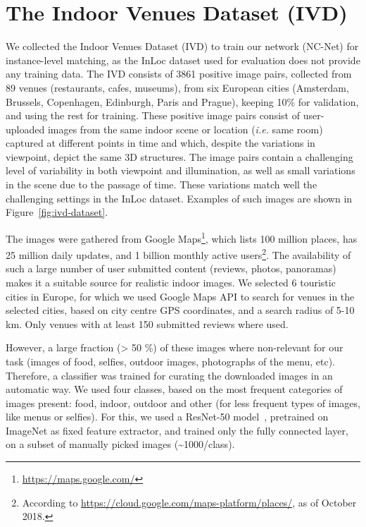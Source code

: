 \documentclass{article}
\begin{document}
\section{The Indoor Venues Dataset (IVD)\label{apx:indoor_venues_dataset}}
We collected the Indoor Venues Dataset (IVD) to train our network (NC-Net) for instance-level matching, as the InLoc \cite{Taira18} dataset
 used for evaluation does not provide any training data. 
The IVD consists of 3861 positive image pairs, collected from 89 venues (restaurants, cafes, museums), from six European cities (Amsterdam, Brussels, Copenhagen, Edinburgh, Paris and Prague), keeping 10\% for validation, and using the rest for training.
These positive image pairs consist of user-uploaded images
from the same indoor scene or location (\emph{i.e.} same room) captured at different points in time and which, despite the variations in viewpoint, depict the same 3D structures.  The image pairs contain a challenging level of variability in both viewpoint and illumination, as well as small variations in the scene due to the passage of time. These variations match well the challenging settings in the InLoc dataset. Examples of such images are shown in Figure~\ref{fig:ivd-dataset}.

The images were gathered from Google Maps\footnote{\url{https://maps.google.com/}}, which lists 100 million places, has 25 million daily updates, and 1 billion monthly active users\footnote{According to \url{https://cloud.google.com/maps-platform/places/}, as of October 2018.}. The availability of such a large number of user submitted content (reviews, photos, panoramas) makes it a suitable source for realistic indoor images.
We selected 6 touristic cities in Europe, for which we used Google Maps API 
to search for venues in the selected cities, based on city centre GPS coordinates, and a search radius of 5-10 km. Only venues with at least 150 submitted reviews where used.

However, a large fraction (> 50 \%) 
of these images where non-relevant for our task (images of food, selfies, outdoor images, photographs of the menu, etc). Therefore, a classifier was trained for curating the downloaded images in an automatic way. We used four classes, based on the most frequent categories of images present: food, indoor, outdoor and other (for less frequent types of images, like menus or selfies). For this, we used a ResNet-50 model~\cite{he2016deep}, pretrained on ImageNet as fixed feature extractor, and trained only the fully connected layer, on a subset of manually picked images (\textasciitilde{}1000/class). 
\end{document}
